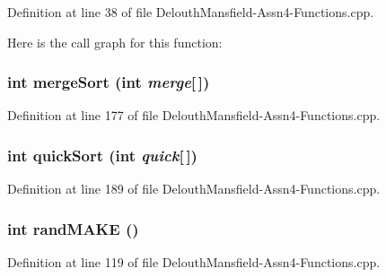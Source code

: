 Definition at line 38 of file DelouthMansfield-\/Assn4-\/Functions.cpp.



Here is the call graph for this function:

\hypertarget{_delouth_mansfield-_assn4-_functions_8cpp_a4c0a2c1198c153a63a9632ce3dc44921}{
\subsubsection[{mergeSort}]{\setlength{\rightskip}{0pt plus 5cm}int mergeSort (int {\em merge}\mbox{[}$\,$\mbox{]})}}
\label{_delouth_mansfield-_assn4-_functions_8cpp_a4c0a2c1198c153a63a9632ce3dc44921}


Definition at line 177 of file DelouthMansfield-\/Assn4-\/Functions.cpp.

\hypertarget{_delouth_mansfield-_assn4-_functions_8cpp_a9e940b0f849a62e9ff4319606269ae38}{
\subsubsection[{quickSort}]{\setlength{\rightskip}{0pt plus 5cm}int quickSort (int {\em quick}\mbox{[}$\,$\mbox{]})}}
\label{_delouth_mansfield-_assn4-_functions_8cpp_a9e940b0f849a62e9ff4319606269ae38}


Definition at line 189 of file DelouthMansfield-\/Assn4-\/Functions.cpp.

\hypertarget{_delouth_mansfield-_assn4-_functions_8cpp_a191743d28b671610e8d78df14b41ed9e}{
\subsubsection[{randMAKE}]{\setlength{\rightskip}{0pt plus 5cm}int randMAKE ()}}
\label{_delouth_mansfield-_assn4-_functions_8cpp_a191743d28b671610e8d78df14b41ed9e}


Definition at line 119 of file DelouthMansfield-\/Assn4-\/Functions.cpp.



